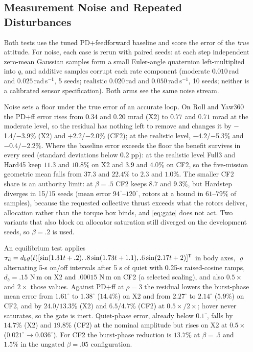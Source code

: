 \documentclass[letterpaper, 10 pt, conference]{ieeeconf}
\newcommand{\T}{^{\mathsf T}}
\begin{document}
\subsection{Measurement Noise and Repeated Disturbances}
\label{sec:noise}
Both tests use the tuned PD+feedforward baseline and score the error of the \emph{true} attitude. For noise, each case is rerun with paired seeds: at each step independent zero-mean Gaussian samples form a small Euler-angle quaternion left-multiplied into $q$, and additive samples corrupt each rate component (moderate $0.010$\,rad and $0.025$\,rad\,s$^{-1}$, 5 seeds; realistic $0.020$\,rad and $0.050$\,rad\,s$^{-1}$, 10 seeds; neither is a calibrated sensor specification). Both arms see the same noise stream.

Noise sets a floor under the true error of an accurate loop. On Roll and Yaw360 the PD+ff error rises from $0.34$ and $0.20$ mrad (X2) to $0.77$ and $0.71$ mrad at the moderate level, so the residual has nothing left to remove and changes it by $-$1.4/$-$3.9\% (X2) and $+$2.2/$-$2.0\% (CF2); at the realistic level, $-$4.2/$-$5.3\% and $-$0.4/$-$2.2\%. Where the baseline error exceeds the floor the benefit survives in every seed (standard deviations below $0.2$ pp): at the realistic level Full3 and Hard45 keep $11.3$ and $10.8\%$ on X2 and $3.9$ and $4.0\%$ on CF2, so the five-mission geometric mean falls from $37.3$ and $22.4\%$ to $2.3$ and $1.0\%$. The smaller CF2 share is an authority limit: at $\beta=.5$ CF2 keeps $8.7$ and $9.3\%$, but Hardstep diverges in 15/15 seeds (mean error $94^\circ$--$120^\circ$, rotors at a bound in $61$--$79\%$ of samples), because the requested collective thrust exceeds what the rotors deliver, allocation rather than the torque box binds, and \eqref{eq:gate} does not act. Two variants that also block on allocator saturation still diverged on the development seeds, so $\beta=.2$ is used.

\label{sec:disturbance}
An equilibrium test applies $\bm\tau_{\rm d}=d_b\varrho(t)[\sin(1.31t+.2),\allowbreak .8\sin(1.73t+1.1),\allowbreak.6\sin(2.17t+2)]\T$ in body axes, $\varrho$ alternating 5-s on/off intervals after 5 s of quiet with 0.25-s raised-cosine ramps, $d_b=.15$ N\,m on X2 and $.00015$ N\,m on CF2 (a selected scaling), and also $0.5\times$ and $2\times$ those values. Against PD+ff at $\rho=3$ the residual lowers the burst-phase mean error from $1.61^\circ$ to $1.38^\circ$ ($14.4\%$) on X2 and from $2.27^\circ$ to $2.14^\circ$ ($5.9\%$) on CF2, and by $24.0/13.3\%$ (X2) and $6.5/4.7\%$ (CF2) at $0.5\times/2\times$; hover never saturates, so the gate is inert. Quiet-phase error, already below $0.1^\circ$, falls by $14.7\%$ (X2) and $19.8\%$ (CF2) at the nominal amplitude but rises on X2 at $0.5\times$ ($0.021^\circ\to0.036^\circ$). For CF2 the burst-phase reduction is $13.7\%$ at $\beta=.5$ and $1.5\%$ in the ungated $\beta=.05$ configuration.
\end{document}
